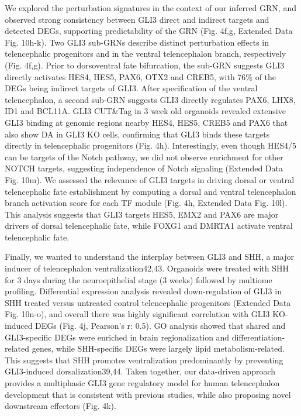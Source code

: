 We explored the perturbation signatures in the context of our inferred GRN, and observed strong consistency between GLI3 direct and indirect targets and detected DEGs, supporting predictability of the GRN (Fig. 4f,g, Extended Data Fig. 10h-k). Two GLI3 sub-GRNs describe distinct perturbation effects in telencephalic progenitors and in the ventral telencephalon branch, respectively (Fig. 4f,g). Prior to dorsoventral fate bifurcation, the sub-GRN suggests GLI3 directly activates HES4, HES5, PAX6, OTX2 and CREB5, with 76\% of the DEGs being indirect targets of GLI3. After specification of the ventral telencephalon, a second sub-GRN suggests GLI3 directly regulates PAX6, LHX8, ID1 and BCL11A. GLI3 CUT\&Tag in 3 week old organoids revealed extensive GLI3 binding at genomic regions nearby HES4, HES5, CREB5 and PAX6 that also show DA in GLI3 KO cells, confirming that GLI3 binds these targets directly in telencephalic progenitors (Fig. 4h). Interestingly, even though HES4/5 can be targets of the Notch pathway, we did not observe enrichment for other NOTCH targets, suggesting independence of Notch signaling (Extended Data Fig. 10m). We assessed the relevance of GLI3 targets in driving dorsal or ventral telencephalic fate establishment by computing a dorsal and ventral telencephalon branch activation score for each TF module (Fig. 4h, Extended Data Fig. 10l). This analysis suggests that GLI3 targets HES5, EMX2 and PAX6 are major drivers of dorsal telencephalic fate, while FOXG1 and DMRTA1 activate ventral telencephalic fate.

Finally, we wanted to understand the interplay between GLI3 and SHH, a major inducer of telencephalon ventralization42,43. Organoids were treated with SHH for 3 days during the neuroepithelial stage (3 weeks) followed by multiome profiling. Differential expression analysis revealed down-regulation of GLI3 in SHH treated versus untreated control telencephalic progenitors (Extended Data Fig. 10n-o), and overall there was highly significant correlation with GLI3 KO-induced DEGs (Fig. 4j, Pearson’s r: 0.5). GO analysis showed that shared and GLI3-specific DEGs were enriched in brain regionalization and differentiation-related genes, while SHH-specific DEGs were largely lipid metabolism-related. This suggests that SHH promotes ventralization predominantly by preventing GLI3-induced dorsalization39,44. Taken together, our data-driven approach provides a multiphasic GLI3 gene regulatory model for human telencephalon development that is consistent with previous studies, while also proposing novel downstream effectors (Fig. 4k).


